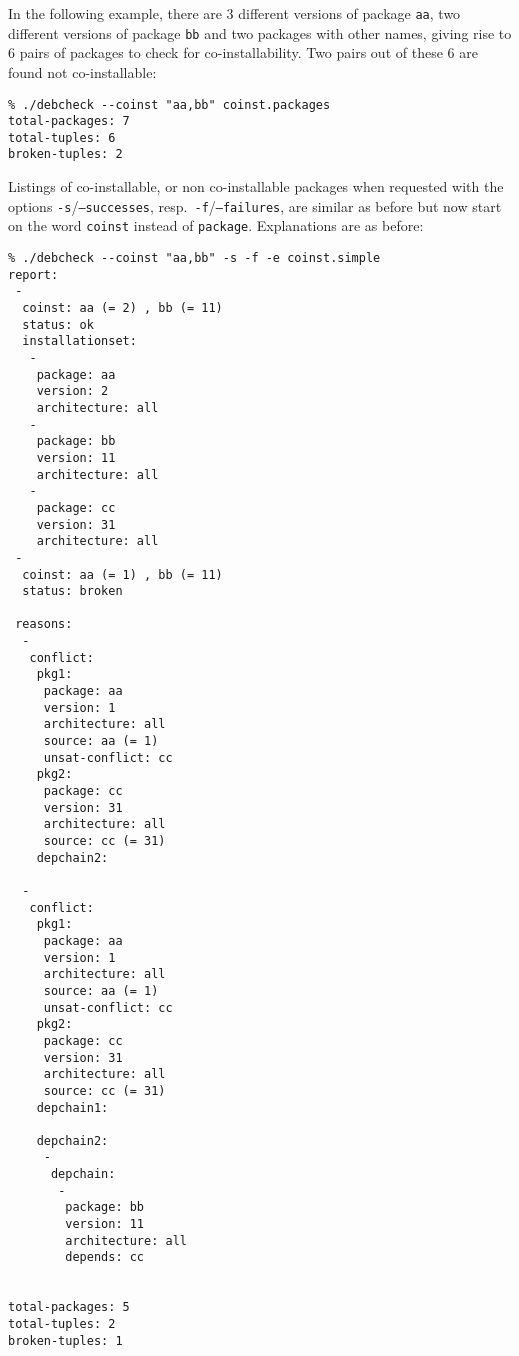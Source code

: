 \begin{example}
  In the following example, there are 3 different versions of package
  \texttt{aa}, two different versions of package \texttt{bb} and two
  packages with other names, giving rise to 6 pairs of packages to
  check for co-installability. Two pairs out of these 6 are found
  not co-installable:
\begin{verbatim}
% ./debcheck --coinst "aa,bb" coinst.packages 
total-packages: 7
total-tuples: 6
broken-tuples: 2
\end{verbatim}
\end{example}

Listings of co-installable, or non co-installable packages when
requested with the options \texttt{-s}/\texttt{--successes},
resp.\ \texttt{-f}/\texttt{--failures}, are similar as before but now
start on the word \texttt{coinst} instead of \texttt{package}. Explanations
are as before:

\begin{example}
\begin{verbatim}
% ./debcheck --coinst "aa,bb" -s -f -e coinst.simple
report:
 -
  coinst: aa (= 2) , bb (= 11)
  status: ok
  installationset:
   -
    package: aa
    version: 2
    architecture: all
   -
    package: bb
    version: 11
    architecture: all
   -
    package: cc
    version: 31
    architecture: all
 -
  coinst: aa (= 1) , bb (= 11)
  status: broken
  
 reasons:
  -
   conflict:
    pkg1:
     package: aa
     version: 1
     architecture: all
     source: aa (= 1)
     unsat-conflict: cc
    pkg2:
     package: cc
     version: 31
     architecture: all
     source: cc (= 31)
    depchain2:
     
  -
   conflict:
    pkg1:
     package: aa
     version: 1
     architecture: all
     source: aa (= 1)
     unsat-conflict: cc
    pkg2:
     package: cc
     version: 31
     architecture: all
     source: cc (= 31)
    depchain1:
     
    depchain2:
     -
      depchain:
       -
        package: bb
        version: 11
        architecture: all
        depends: cc
  
 
total-packages: 5
total-tuples: 2
broken-tuples: 1
\end{verbatim}
\end{example}
